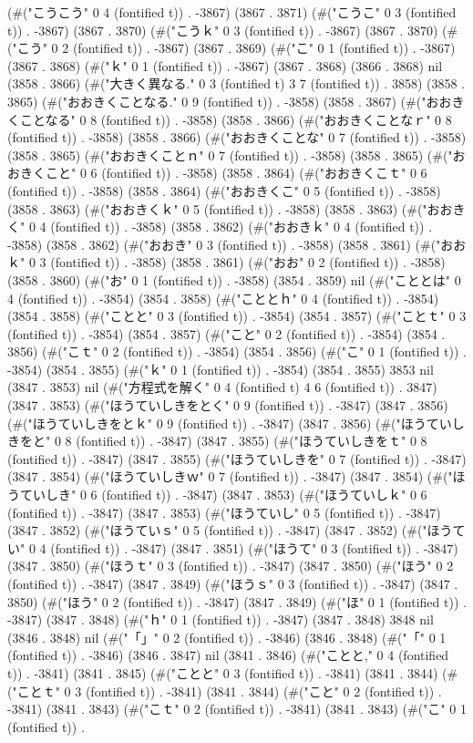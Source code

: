 (#("こうこう" 0 4 (fontified t)) . -3867) (3867 . 3871) (#("こうこ" 0 3 (fontified t)) . -3867) (3867 . 3870) (#("こうｋ" 0 3 (fontified t)) . -3867) (3867 . 3870) (#("こう" 0 2 (fontified t)) . -3867) (3867 . 3869) (#("こ" 0 1 (fontified t)) . -3867) (3867 . 3868) (#("ｋ" 0 1 (fontified t)) . -3867) (3867 . 3868) (3866 . 3868) nil (3858 . 3866) (#("大きく異なる." 0 3 (fontified t) 3 7 (fontified t)) . 3858) (3858 . 3865) (#("おおきくことなる." 0 9 (fontified t)) . -3858) (3858 . 3867) (#("おおきくことなる" 0 8 (fontified t)) . -3858) (3858 . 3866) (#("おおきくことなｒ" 0 8 (fontified t)) . -3858) (3858 . 3866) (#("おおきくことな" 0 7 (fontified t)) . -3858) (3858 . 3865) (#("おおきくことｎ" 0 7 (fontified t)) . -3858) (3858 . 3865) (#("おおきくこと" 0 6 (fontified t)) . -3858) (3858 . 3864) (#("おおきくこｔ" 0 6 (fontified t)) . -3858) (3858 . 3864) (#("おおきくこ" 0 5 (fontified t)) . -3858) (3858 . 3863) (#("おおきくｋ" 0 5 (fontified t)) . -3858) (3858 . 3863) (#("おおきく" 0 4 (fontified t)) . -3858) (3858 . 3862) (#("おおきｋ" 0 4 (fontified t)) . -3858) (3858 . 3862) (#("おおき" 0 3 (fontified t)) . -3858) (3858 . 3861) (#("おおｋ" 0 3 (fontified t)) . -3858) (3858 . 3861) (#("おお" 0 2 (fontified t)) . -3858) (3858 . 3860) (#("お" 0 1 (fontified t)) . -3858) (3854 . 3859) nil (#("こととは" 0 4 (fontified t)) . -3854) (3854 . 3858) (#("こととｈ" 0 4 (fontified t)) . -3854) (3854 . 3858) (#("ことと" 0 3 (fontified t)) . -3854) (3854 . 3857) (#("ことｔ" 0 3 (fontified t)) . -3854) (3854 . 3857) (#("こと" 0 2 (fontified t)) . -3854) (3854 . 3856) (#("こｔ" 0 2 (fontified t)) . -3854) (3854 . 3856) (#("こ" 0 1 (fontified t)) . -3854) (3854 . 3855) (#("ｋ" 0 1 (fontified t)) . -3854) (3854 . 3855) 3853 nil (3847 . 3853) nil (#("方程式を解く" 0 4 (fontified t) 4 6 (fontified t)) . 3847) (3847 . 3853) (#("ほうていしきをとく" 0 9 (fontified t)) . -3847) (3847 . 3856) (#("ほうていしきをとｋ" 0 9 (fontified t)) . -3847) (3847 . 3856) (#("ほうていしきをと" 0 8 (fontified t)) . -3847) (3847 . 3855) (#("ほうていしきをｔ" 0 8 (fontified t)) . -3847) (3847 . 3855) (#("ほうていしきを" 0 7 (fontified t)) . -3847) (3847 . 3854) (#("ほうていしきｗ" 0 7 (fontified t)) . -3847) (3847 . 3854) (#("ほうていしき" 0 6 (fontified t)) . -3847) (3847 . 3853) (#("ほうていしｋ" 0 6 (fontified t)) . -3847) (3847 . 3853) (#("ほうていし" 0 5 (fontified t)) . -3847) (3847 . 3852) (#("ほうていｓ" 0 5 (fontified t)) . -3847) (3847 . 3852) (#("ほうてい" 0 4 (fontified t)) . -3847) (3847 . 3851) (#("ほうて" 0 3 (fontified t)) . -3847) (3847 . 3850) (#("ほうｔ" 0 3 (fontified t)) . -3847) (3847 . 3850) (#("ほう" 0 2 (fontified t)) . -3847) (3847 . 3849) (#("ほうｓ" 0 3 (fontified t)) . -3847) (3847 . 3850) (#("ほう" 0 2 (fontified t)) . -3847) (3847 . 3849) (#("ほ" 0 1 (fontified t)) . -3847) (3847 . 3848) (#("ｈ" 0 1 (fontified t)) . -3847) (3847 . 3848) 3848 nil (3846 . 3848) nil (#("「」" 0 2 (fontified t)) . -3846) (3846 . 3848) (#("「" 0 1 (fontified t)) . -3846) (3846 . 3847) nil (3841 . 3846) (#("ことと," 0 4 (fontified t)) . -3841) (3841 . 3845) (#("ことと" 0 3 (fontified t)) . -3841) (3841 . 3844) (#("ことｔ" 0 3 (fontified t)) . -3841) (3841 . 3844) (#("こと" 0 2 (fontified t)) . -3841) (3841 . 3843) (#("こｔ" 0 2 (fontified t)) . -3841) (3841 . 3843) (#("こ" 0 1 (fontified t)) . 